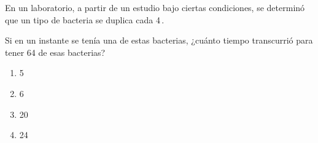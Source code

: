 \begin{problem}
    En un laboratorio, a partir de un estudio bajo ciertas condiciones, se determinó que un tipo de bacteria se duplica cada 4\,.

    Si en un instante se tenía una de estas bacterias, ¿cuánto tiempo transcurrió para tener 64 de esas bacterias?

    \begin{enumerate}[label=\Alph*.]
        \item 5\,
        \item 6\,
        \item 20\,
        \item 24\,
    \end{enumerate}
\end{problem}
